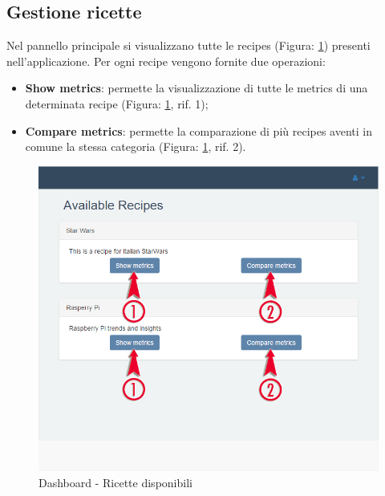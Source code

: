 	\pagebreak
	\subsection{Gestione ricette} %
	\label{sec:gestione_ricette}
		Nel pannello principale si visualizzano tutte le recipes\gloss{} (Figura: \ref{fig:ricette_disponibili}) presenti nell'applicazione.\newline
		Per ogni recipe\gloss{} vengono fornite due operazioni:
		\begin{itemize}
			\item \textbf{Show metrics}: permette la visualizzazione di tutte le metrics\gloss{} di una determinata recipe\gloss{} (Figura: \ref{fig:ricette_disponibili}, rif. 1);
			\item \textbf{Compare metrics}: permette la comparazione di più recipes\gloss{} aventi in comune la stessa categoria (Figura: \ref{fig:ricette_disponibili}, rif. 2).
		\end{itemize}

		\begin{figure}[H]
			\centering
			\centerline{\includegraphics[width=14cm]{images/ricette_disponibili.png}}
			\caption{Dashboard - Ricette disponibili}
			\label{fig:ricette_disponibili}
		\end{figure}


		\pagebreak

